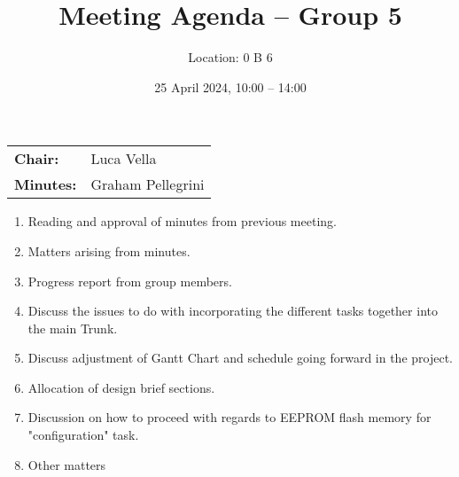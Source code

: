 \documentclass{cce2014-meetings}
\title{Meeting Agenda -- Group 5}
\author{Location: 0 B 6}
\date{25 April 2024, 10:00 -- 14:00}
\begin{document}
\maketitle
\begin{center}
  \begin{tabular}{ll}
    \textbf{Chair:}   & Luca Vella     \\
    \textbf{Minutes:} & Graham Pellegrini
  \end{tabular}
\end{center}

\begin{enumerate}

  \item Reading and approval of minutes from previous meeting.

  \item Matters arising from minutes.

  \item Progress report from group members.

  \item Discuss the issues to do with incorporating the different tasks together into the main Trunk.

  \item Discuss adjustment of Gantt Chart and schedule going forward in the project.

  \item Allocation of design brief sections.

  \item Discussion on how to proceed with regards to EEPROM flash memory for "configuration" task.

  \item Other matters

\end{enumerate}
\end{document}
